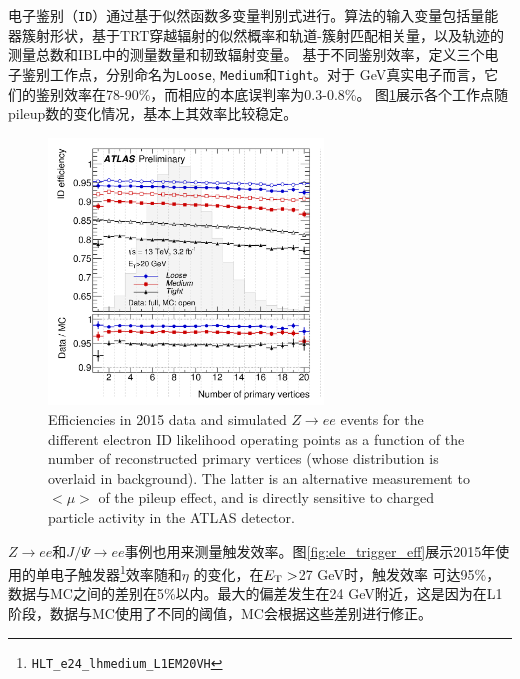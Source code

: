 电子鉴别（\texttt{ID}）通过基于似然函数多变量判别式\cite{ATLAS-CONF-2016-024}进行。算法的输入变量包括量能器簇射形状，基于TRT穿越辐射的似然概率和轨道-簇射匹配相关量，以及轨迹的测量总数和IBL中的测量数量和韧致辐射变量。
基于不同鉴别效率，定义三个电子鉴别工作点，分别命名为\texttt{Loose}, \texttt{Medium}和\texttt{Tight}。对于 GeV真实电子而言，它们的鉴别效率在78-90\%，而相应的本底误判率为0.3-0.8\%。
图\ref{fig:ele_id_eff_pileup}展示各个工作点随pileup数的变化情况，基本上其效率比较稳定。
\begin{figure}
\centering
\includegraphics[width=0.65\textwidth]{fig/ele_id_eff_pileup.png}
\caption{Efficiencies in 2015 data and simulated $Z\rightarrow ee$ events for the different electron ID likelihood operating points as a function of the number of reconstructed primary vertices (whose distribution is overlaid in background)\cite{ATLAS-CONF-2016-024}. The latter is an alternative measurement to $<\mu>$ of the pileup effect, and is directly sensitive to charged particle activity in the ATLAS detector.}
\label{fig:ele_id_eff_pileup}
\end{figure}
$Z\rightarrow ee$和$J/\Psi\rightarrow ee$事例也用来测量触发效率\cite{ATLAS-CONF-2016-024}。图\ref{fig:ele_trigger_eff}展示2015年使用的单电子触发器\footnote{\texttt{HLT\_e24\_lhmedium\_L1EM20VH}}效率随\et 和$\eta$ 的变化，在$E_{\text{T}}>$27 GeV时，触发效率
可达95\%，数据与MC之间的差别在5\%以内。最大的偏差发生在24 GeV附近，这是因为在L1阶段，数据与MC使用了不同的阈值，MC会根据这些差别进行修正。
